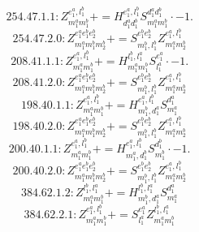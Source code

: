 \documentclass[letterpaper,10pt,fleqn,leqno,onecolumn]{article}
\begin{document}
\begin{equation} \;\;\;\;\;\;  254.47.1.1: Z^{e_{1}^{a},l_{1}^{b}}_{m_{1}^{a}m_{1}^{b}}+=H^{e_{1}^{a},l_{1}^{b}}_{d_{1}^{a}d_{1}^{b}}S^{d_{1}^{a}d_{1}^{b}}_{m_{1}^{a}m_{1}^{b}}\cdot -1. \end{equation}
\begin{equation} \;\;\;\;\;\;  254.47.2.0: Z^{e_{1}^{a}e_{1}^{b}e_{2}^{b}}_{m_{1}^{a}m_{1}^{b}m_{2}^{b}}+=S^{e_{1}^{b}e_{2}^{b}}_{m_{1}^{b},l_{1}^{b}}Z^{e_{1}^{a},l_{1}^{b}}_{m_{1}^{a}m_{2}^{b}} \end{equation}
\begin{equation} \;\;\;\;\;\;  208.41.1.1: Z^{e_{1}^{a},l_{1}^{b}}_{m_{1}^{a}m_{1}^{b}}+=H^{l_{1}^{b},l_{1}^{a}}_{m_{1}^{a}m_{1}^{b}}S^{e_{1}^{a}}_{l_{1}^{a}}\cdot -1. \end{equation}
\begin{equation} \;\;\;\;\;\;  208.41.2.0: Z^{e_{1}^{a}e_{1}^{b}e_{2}^{b}}_{m_{1}^{a}m_{1}^{b}m_{2}^{b}}+=S^{e_{1}^{b}e_{2}^{b}}_{m_{1}^{b},l_{1}^{b}}Z^{e_{1}^{a},l_{1}^{b}}_{m_{1}^{a}m_{2}^{b}} \end{equation}
\begin{equation} \;\;\;\;\;\;  198.40.1.1: Z^{e_{1}^{a},l_{1}^{b}}_{m_{1}^{a}m_{1}^{b}}+=H^{e_{1}^{a},l_{1}^{b}}_{m_{1}^{b},d_{1}^{a}}S^{d_{1}^{a}}_{m_{1}^{a}} \end{equation}
\begin{equation} \;\;\;\;\;\;  198.40.2.0: Z^{e_{1}^{a}e_{1}^{b}e_{2}^{b}}_{m_{1}^{a}m_{1}^{b}m_{2}^{b}}+=S^{e_{1}^{b}e_{2}^{b}}_{m_{1}^{b},l_{1}^{b}}Z^{e_{1}^{a},l_{1}^{b}}_{m_{1}^{a}m_{2}^{b}} \end{equation}
\begin{equation} \;\;\;\;\;\;  200.40.1.1: Z^{e_{1}^{a},l_{1}^{b}}_{m_{1}^{a}m_{1}^{b}}+=H^{e_{1}^{a},l_{1}^{b}}_{m_{1}^{a},d_{1}^{b}}S^{d_{1}^{b}}_{m_{1}^{b}}\cdot -1. \end{equation}
\begin{equation} \;\;\;\;\;\;  200.40.2.0: Z^{e_{1}^{a}e_{1}^{b}e_{2}^{b}}_{m_{1}^{a}m_{1}^{b}m_{2}^{b}}+=S^{e_{1}^{b}e_{2}^{b}}_{m_{1}^{b},l_{1}^{b}}Z^{e_{1}^{a},l_{1}^{b}}_{m_{1}^{a}m_{2}^{b}} \end{equation}
\begin{equation} \;\;\;\;\;\;  384.62.1.2: Z^{l_{1}^{b},l_{1}^{a}}_{m_{1}^{a}m_{1}^{b}}+=H^{l_{1}^{b},l_{1}^{a}}_{m_{1}^{b},d_{1}^{a}}S^{d_{1}^{a}}_{m_{1}^{a}} \end{equation}
\begin{equation} \;\;\;\;\;\;  384.62.2.1: Z^{e_{1}^{a},l_{1}^{b}}_{m_{1}^{a}m_{1}^{b}}+=S^{e_{1}^{a}}_{l_{1}^{a}}Z^{l_{1}^{b},l_{1}^{a}}_{m_{1}^{a}m_{1}^{b}} \end{equation}
\end{document}
